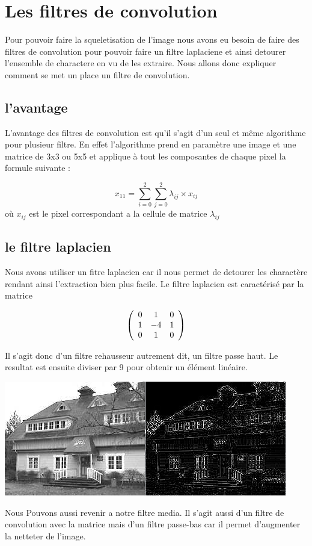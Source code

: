 \section{Les filtres de convolution}
Pour pouvoir faire la squeletisation de l'image nous avons eu besoin de faire des filtres de convolution pour pouvoir faire un filtre laplaciene et ainsi detourer l'ensemble de charactere en vu de les extraire. Nous allons donc expliquer comment se met un place un filtre de convolution.
\subsection{l'avantage}
L'avantage des filtres de convolution est qu'il s'agit d'un seul et même algorithme pour plusieur filtre. En effet l'algorithme prend en paramètre une image et une matrice de 3x3 ou 5x5 et applique à tout les composantes de chaque pixel la formule suivante :
\begin{center}
\[x_{11} = \sum_{i=0}^2\sum_{j=0}^2 \lambda_{ij} \times x_{ij}\]
où $x_{ij}$ est le pixel correspondant a la cellule de matrice $\lambda_{ij}$
\end{center}
\subsection{le filtre laplacien}
Nous avons utiliser un fitre laplacien car il nous permet de detourer les charactère rendant ainsi l'extraction bien plus facile.
Le filtre laplacien est caractérisé par la matrice 
\begin{center}
\[ \left(
  \begin{array}{ c c c }
     0 & 1  & 0\\
     1 & -4 & 1\\
     0 & 1  & 0
  \end{array} \right)
\]
\end{center}
Il s'agit donc d'un filtre rehausseur autrement dit, un filtre passe haut.
Le resultat est ensuite diviser par 9 pour obtenir un élément linéaire.
\begin{center}
\includegraphics{conv-laplacian-result.png}
\end{center}
Nous Pouvons aussi revenir a notre filtre media. Il s'agit aussi d'un filtre de convolution avec la matrice mais d'un filtre passe-bas car il permet d'augmenter la netteter de l'image.
